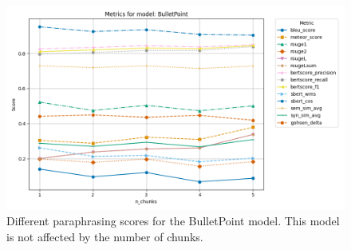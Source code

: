 \begin{figure}[htbp]
    \centering
    \includegraphics[width=\textwidth]{images/paraphrasing/experiments/BulletPoint_metrics_plot.png}
    \caption{Different paraphrasing scores for the BulletPoint model. 
    This model is not affected by the number of chunks.}
    \label{fig:abl_chunks_BulletPoint}
\end{figure}